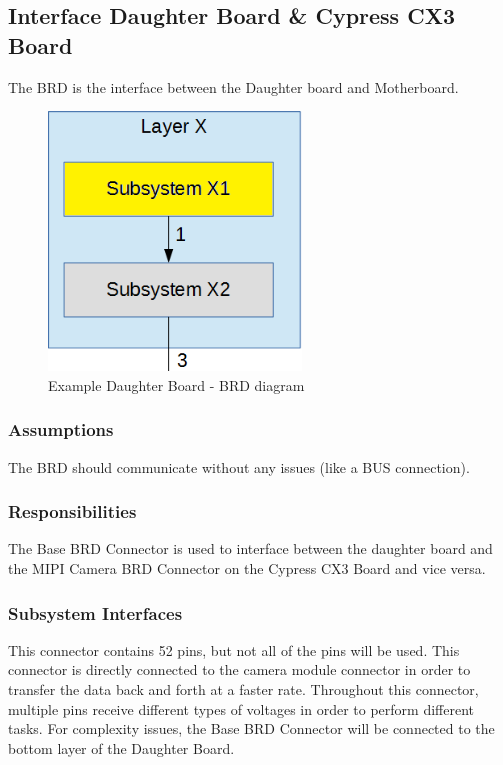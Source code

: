 \subsection{Interface Daughter Board & Cypress CX3 Board}
The BRD is the interface between the Daughter board and Motherboard.

\begin{figure}[h!]
	\centering
 	\includegraphics[width=0.60\textwidth]{images/subsystem}
 \caption{Example Daughter Board - BRD diagram}
\end{figure}

\subsubsection{Assumptions}
The BRD should communicate without any issues (like a BUS connection).

\subsubsection{Responsibilities}
The Base BRD Connector is used to interface between the daughter board and the MIPI Camera BRD Connector on the Cypress CX3 Board and vice versa.

\subsubsection{Subsystem Interfaces}
This connector contains 52 pins, but not all of the pins will be used. This connector is directly connected to the camera module connector in order to transfer the data back and forth at a faster rate.  Throughout this connector, multiple pins receive different types of voltages in order to perform different tasks. For complexity issues, the Base BRD Connector will be connected to the bottom layer of the Daughter Board.

